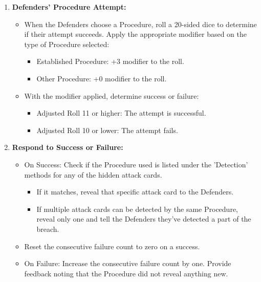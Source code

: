 \documentclass[letterpaper]{article} %
\begin{document}
\begin{enumerate}
    \item \textbf{Defenders’ Procedure Attempt:}
    \begin{itemize}
        \item When the Defenders choose a Procedure, roll a 20-sided dice to determine if their attempt succeeds. Apply the appropriate modifier based on the type of Procedure selected:
        \begin{itemize}
            \item Established Procedure: +3 modifier to the roll.
            \item Other Procedure: +0 modifier to the roll.
        \end{itemize}
        \item With the modifier applied, determine success or failure:
        \begin{itemize}
            \item Adjusted Roll 11 or higher: The attempt is successful.
            \item Adjusted Roll 10 or lower: The attempt fails.
        \end{itemize}
    \end{itemize}

    \item \textbf{Respond to Success or Failure:}
    \begin{itemize}
        \item On Success: Check if the Procedure used is listed under the 'Detection' methods for any of the hidden attack cards.
        \begin{itemize}
            \item If it matches, reveal that specific attack card to the Defenders.
            \item If multiple attack cards can be detected by the same Procedure, reveal only one and tell the Defenders they've detected a part of the breach.
        \end{itemize}
        \item Reset the consecutive failure count to zero on a success.
        \item On Failure: Increase the consecutive failure count by one. Provide feedback noting that the Procedure did not reveal anything new.
    \end{itemize}


\end{enumerate}
\end{document}
